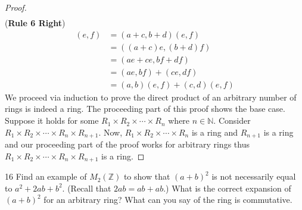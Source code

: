 \begin{proof}
\begin{align*}
    \end{align*}
    (\textbf{Rule 6 Right})
    \begin{align*}
        [(a, b)(c, d)](e, f) &= (a + c, b + d)(e, f) \\
                             &= ((a + c)e, (b + d)f) \\
                             &= (ae + ce, bf + df) \\
                             &= (ae, bf) + (ce, df) \\
                             &= (a, b)(e, f) + (c, d)(e, f)
    \end{align*}
    We proceed via induction to prove the direct product of an arbitrary number of rings
        is indeed a ring.
    The proceeding part of this proof shows the base case.
    Suppose it holds for some $R_1 \times R_2 \times \cdots \times R_n$ where $n \in \mathbb{N}$.
    Consider $R_1 \times R_2 \times \cdots \times R_n \times R_{n + 1}$.
    Now, $R_1 \times R_2 \times \cdots \times R_n$ is a ring and $R_{n + 1}$ is a ring 
    and our proceeding part of the proof works for arbitrary rings thus 
    $R_1 \times R_2 \times \cdots \times R_n \times R_{n + 1}$ is a ring.
\end{proof}

\begin{problem}{16}
    Find an example of $M_2(\mathbb{Z})$ to show that 
    $(a + b)^2$ is not necessarily equal to 
    $a^2 + 2ab + b^2$. (Recall that $2ab = ab + ab$.) What is 
    the correct expansion of $(a + b)^2$ for an arbitrary ring?
    What can you say of the ring is commutative.
\end{problem}
\solved

